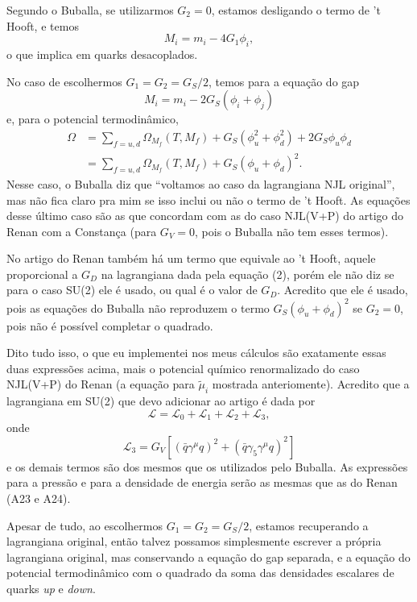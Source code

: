 Segundo o Buballa, se utilizarmos $G_2 = 0$, estamos desligando o termo de 't Hooft, e temos
\begin{equation}
    M_i = m_i - 4G_1\phi_i,
\end{equation}
%
o que implica em quarks desacoplados.

No caso de escolhermos $G_1 = G_2 = G_S / 2$, temos para a equação do gap
\begin{equation}
    M_i = m_i - 2G_S(\phi_i + \phi_j)
\end{equation}
%
e, para o potencial termodinâmico,
\begin{align}
    \Omega &= \sum_{f= u,d} \Omega_{M_f}(T, M_f) + G_S(\phi^2_u + \phi_d^2) + 2 G_S\phi_u\phi_d \\
    &= \sum_{f= u,d} \Omega_{M_f}(T, M_f) + G_S(\phi_u + \phi_d)^2.
\end{align}
%
Nesse caso, o Buballa diz que ``voltamos ao caso da lagrangiana NJL original'', mas não fica claro pra mim se isso inclui ou não o termo de 't Hooft. As equações desse último caso são as que concordam com as do caso NJL(V+P) do artigo do Renan com a Constança (para $G_V = 0$, pois o Buballa não tem esses termos).

No artigo do Renan também há um termo que equivale ao 't Hooft, aquele proporcional a $G_D$ na lagrangiana dada pela equação (2), porém ele não diz se para o caso SU(2) ele é usado, ou qual é o valor de $G_D$. Acredito que ele é usado, pois as equações do Buballa não reproduzem o termo $G_S(\phi_u + \phi_d)^2$ se $G_2 = 0$, pois não é possível completar o quadrado.

Dito tudo isso, o que eu implementei nos meus cálculos são exatamente essas duas expressões acima, mais o potencial químico renormalizado do caso NJL(V+P) do Renan (a equação para $\tilde{\mu}_i$ mostrada anteriomente). Acredito que a lagrangiana em SU(2) que devo adicionar ao artigo é dada por
\begin{equation}
    \mathscr{L} = \mathscr{L}_0 + \mathscr{L}_1 + \mathscr{L}_2 + \mathscr{L}_3,
\end{equation}
%
onde
\begin{equation}
    \mathscr{L}_3 = G_V[(\bar{q}\gamma^\mu q)^2 + (\bar{q}\gamma_5\gamma^\mu q)^2]
\end{equation}
%
e os demais termos são dos mesmos que os utilizados pelo Buballa. As expressões para a pressão e para a densidade de energia serão as mesmas que as do Renan (A23 e A24).

Apesar de tudo, ao escolhermos $G_1 = G_2 = G_S/2$, estamos recuperando a lagrangiana original, então talvez possamos simplesmente escrever a própria lagrangiana original, mas conservando a equação do gap separada, e a equação do potencial termodinâmico com o quadrado da soma das densidades escalares de quarks \emph{up} e \emph{down}.

